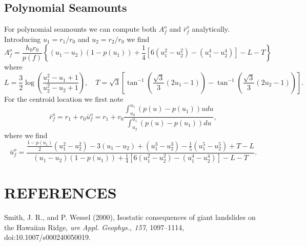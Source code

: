 \documentclass[12pt,letterpaper,margin=0.5in]{report}
\begin{document}
\subsection{Polynomial Seamounts}

For polynomial seamounts we can compute both $A_f^o$ and $\bar{r}_f^o$ analytically.  Introducing $u_1 = r_1/r_0$ and $u_2 = r_2 / r_0$ we find
\begin{equation}
A_f^o = \frac{h_0 r_0}{p(f)} \left \{ (u_1 - u_2)(1 - p(u_1)) + \frac{1}{4}\left [ 6(u_1^2 - u_2^2) - (u_1^4 - u_2^4)\right ] -  L - T \right \}
\end{equation}
where 
\begin{equation}
L = \frac{3}{2} \log \left ( \frac{u_1^2 - u_1 + 1}{u_2^2 - u_2 + 1}\right ), \quad T = \sqrt{3} \left [ \tan^{-1} \left (\frac{\sqrt{3}}{3}(2u_1 - 1)\right ) - \tan^{-1} \left (\frac{\sqrt{3}}{3}(2u_2 - 1)\right )\right ].
\end{equation}
For the centroid location we first note
\begin{equation}
\bar{r}_f^o = r_1 + r_0 \bar{u}_f^o = r_1 + r_0 \frac{\int_{u_2}^{u_1} \left ( p(u) - p(u_1)\right ) u du}{\int_{u_2}^{u_1} \left ( p(u) - p(u_1)\right )du},
\end{equation}
where we find
\begin{equation}
\bar{u}_f^o = \frac{\frac{1 - p(u_1)}{2}(u_1^2 - u_2^2) - 3 (u_1 - u_2) + (u_1^3 - u_2^3) - \frac{1}{5}(u_1^5 - u_2^5) + T - L}{(u_1 - u_2)(1 - p(u_1)) + \frac{1}{4}\left [ 6(u_1^2 - u_2^2) - (u_1^4 - u_2^4)\right ] -  L - T}.
\end{equation}

\section{REFERENCES}

Smith, J. R., and P. Wessel (2000), Isostatic consequences of giant landslides on the Hawaiian Ridge,
{\it ure Appl. Geophys., 157}, 1097--1114, doi:10.1007/s000240050019.
\end{document}
